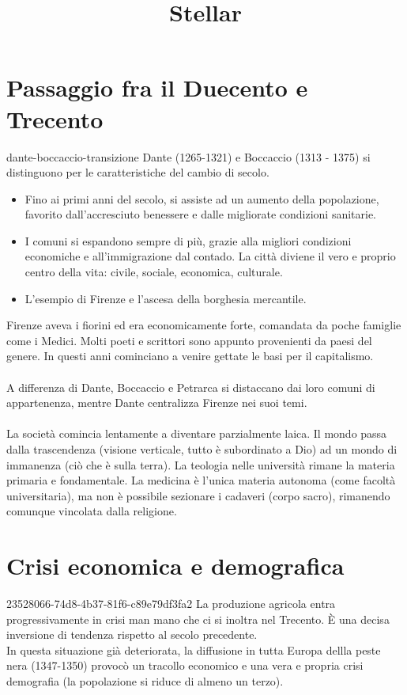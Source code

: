 \documentclass[preview]{standalone}
\begin{document}
\title{Stellar}
\genpage

\section{Passaggio fra il Duecento e Trecento}

\begin{snippet}{dante-boccaccio-transizione}
    Dante (1265-1321) e Boccaccio (1313 - 1375)
    si distinguono per le caratteristiche del cambio di secolo.
    
    \begin{itemize}
        \item Fino ai primi anni del secolo, si assiste ad un aumento della popolazione, favorito dall'accresciuto benessere e dalle migliorate condizioni sanitarie.
        \item I comuni si espandono sempre di più, grazie alla migliori condizioni economiche e all'immigrazione dal contado. La città diviene il vero e proprio centro della vita: civile, sociale, economica, culturale.
        \item L'esempio di Firenze e l'ascesa della borghesia mercantile.
    \end{itemize}
    
    Firenze aveva i fiorini ed era economicamente forte, comandata da poche famiglie come i Medici.
    Molti poeti e scrittori sono appunto provenienti da paesi del genere.
    In questi anni cominciano a venire gettate le basi per il capitalismo.
    \\\\
    A differenza di Dante, Boccaccio e Petrarca si distaccano dai loro comuni di appartenenza,
    mentre Dante centralizza Firenze nei suoi temi.
    \\\\
    La società comincia lentamente a diventare parzialmente laica.
    Il mondo passa dalla trascendenza (visione verticale, tutto è subordinato a Dio)
    ad un mondo di immanenza (ciò che è sulla terra).
    La teologia nelle università rimane la materia primaria e fondamentale.
    La medicina è l'unica materia autonoma (come facoltà universitaria), ma non è possibile sezionare i cadaveri (corpo sacro),
    rimanendo comunque vincolata dalla religione.
\end{snippet}

\section{Crisi economica e demografica}

\begin{snippet}{23528066-74d8-4b37-81f6-c89e79df3fa2}
    La produzione agricola entra progressivamente in crisi man mano che ci si inoltra nel Trecento.
    È una decisa inversione di tendenza rispetto al secolo precedente.\\
    In questa situazione già deteriorata, la diffusione in tutta Europa dellla peste nera (1347-1350) provocò
    un tracollo economico e una vera e propria crisi demografia (la popolazione si riduce di almeno un terzo).
\end{snippet}
\end{document}
